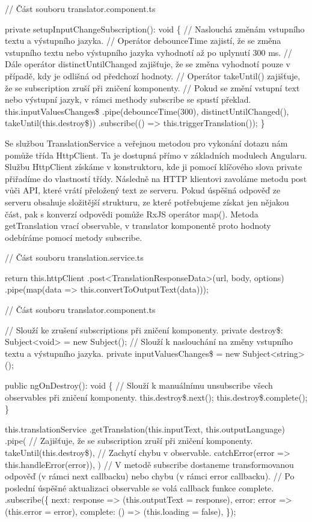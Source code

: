 \begin{prog}
// Část souboru translator.component.ts

private setupInputChangeSubscription(): void \{
  // Naslouchá změnám vstupního textu a výstupního jazyka.
  // Operátor debounceTime zajistí, že se změna vstupního textu 
    nebo výstupního jazyka vyhodnotí až po uplynutí 300 ms.
  // Dále operátor distinctUntilChanged zajišťuje, 
    že se změna vyhodnotí pouze v případě, kdy je odlišná od předchozí hodnoty.
  // Operátor takeUntil() zajišťuje, 
    že se subscription zruší při zničení komponenty.
  // Pokud se změní vstupní text nebo výstupní jazyk, 
    v rámci methody subscribe se spustí překlad.
  this.inputValuesChanges\$
    .pipe(debounceTime(300), distinctUntilChanged(), takeUntil(this.destroy\$))
    .subscribe(() => this.triggerTranslation());
\}
\end{prog}

Se službou TranslationService a veřejnou metodou pro vykonání dotazu nám pomůže třída HttpClient. Ta je dostupná přímo v základních modulech Angularu.
Službu HttpClient získáme v konstruktoru, kde ji pomocí klíčového slova private přiřadíme do vlastností třídy. 
Následně na HTTP klientovi zavoláme metodu post vůči API, které vrátí přeložený text ze serveru. 
Pokud úspěšná odpověď ze serveru obsahuje složitější strukturu, ze které potřebujeme získat jen nějakou část, pak s konverzí odpovědi pomůže RxJS operátor map(). 
Metoda getTranslation vrací observable, v translator komponentě proto hodnoty odebíráme pomocí metody subscribe.

\begin{prog}
// Část souboru translation.service.ts

return this.httpClient
  .post<TranslationResponseData>(url, body, options)
  .pipe(map(data => this.convertToOutputText(data)));

// Část souboru translator.component.ts

// Slouží ke zrušení subscriptions při zničení komponenty.
private destroy\$: Subject<void> = new Subject();
// Slouží k naslouchání na změny vstupního textu a výstupního jazyka.
private inputValuesChanges\$ = new Subject<string>();

public ngOnDestroy(): void \{
  // Slouží k manuálnímu unsubscribe všech observables při zničení komponenty.
  this.destroy\$.next();
  this.destroy\$.complete();
\}

this.translationService
  .getTranslation(this.inputText, this.outputLanguage)
  .pipe(
    // Zajišťuje, že se subscription zruší při zničení komponenty.
    takeUntil(this.destroy\$),
    // Zachytí chybu v observable.
    catchError(error => this.handleError(error)),
  )
  // V metodě subscribe dostaneme transformovanou odpověď 
    (v rámci next callbacku) nebo chybu (v rámci error callbacku).
  // Po poslední úspěšné aktualizaci observable se volá callback funkce complete.
  .subscribe(\{
    next: response => (this.outputText = response),
    error: error => (this.error = error),
    complete: () => (this.loading = false),
  \});
\end{prog}

